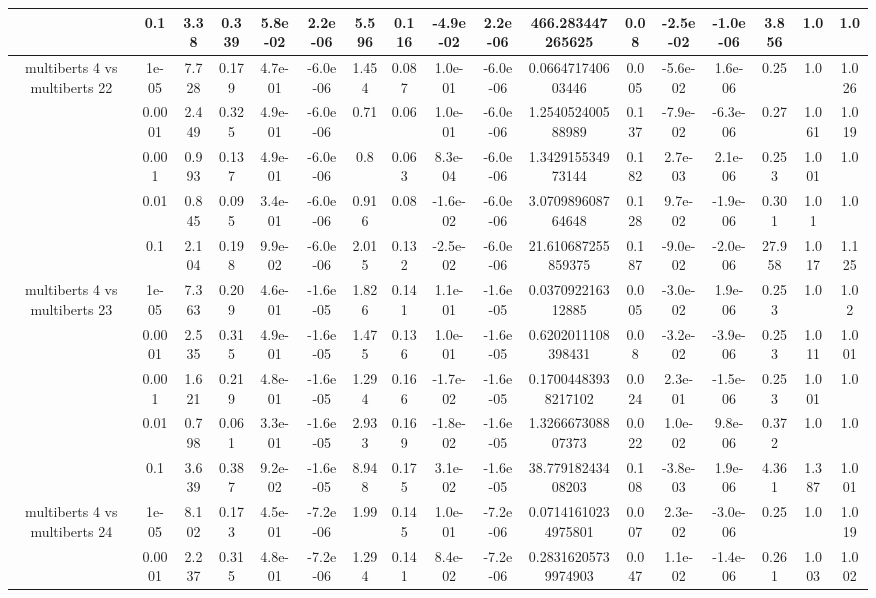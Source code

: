\begin{tabular}{|c|c|c|c|c|c|c|c|c|c|c|c|c|c|c|c|c|}
 & 0.1 & 3.38 & 0.339 & 5.8e-02 & 2.2e-06 & 5.596 & 0.116 & -4.9e-02 & 2.2e-06 & 466.283447265625 & 0.08 & -2.5e-02 & -1.0e-06 & 3.856 & 1.0 & 1.0 \\
\hline
\multirow{5}{*}{multiberts 4 vs multiberts 22} & 1e-05 & 7.728 & 0.179 & 4.7e-01 & -6.0e-06 & 1.454 & 0.087 & 1.0e-01 & -6.0e-06 & 0.066471740603446 & 0.005 & -5.6e-02 & 1.6e-06 & 0.25 & 1.0 & 1.026 \\
 & 0.0001 & 2.449 & 0.325 & 4.9e-01 & -6.0e-06 & 0.71 & 0.06 & 1.0e-01 & -6.0e-06 & 1.254052400588989 & 0.137 & -7.9e-02 & -6.3e-06 & 0.27 & 1.061 & 1.019 \\
 & 0.001 & 0.993 & 0.137 & 4.9e-01 & -6.0e-06 & 0.8 & 0.063 & 8.3e-04 & -6.0e-06 & 1.342915534973144 & 0.182 & 2.7e-03 & 2.1e-06 & 0.253 & 1.001 & 1.0 \\
 & 0.01 & 0.845 & 0.095 & 3.4e-01 & -6.0e-06 & 0.916 & 0.08 & -1.6e-02 & -6.0e-06 & 3.070989608764648 & 0.128 & 9.7e-02 & -1.9e-06 & 0.301 & 1.01 & 1.0 \\
 & 0.1 & 2.104 & 0.198 & 9.9e-02 & -6.0e-06 & 2.015 & 0.132 & -2.5e-02 & -6.0e-06 & 21.610687255859375 & 0.187 & -9.0e-02 & -2.0e-06 & 27.958 & 1.017 & 1.125 \\
\hline
\multirow{5}{*}{multiberts 4 vs multiberts 23} & 1e-05 & 7.363 & 0.209 & 4.6e-01 & -1.6e-05 & 1.826 & 0.141 & 1.1e-01 & -1.6e-05 & 0.037092216312885 & 0.005 & -3.0e-02 & 1.9e-06 & 0.253 & 1.0 & 1.02 \\
 & 0.0001 & 2.535 & 0.315 & 4.9e-01 & -1.6e-05 & 1.475 & 0.136 & 1.0e-01 & -1.6e-05 & 0.6202011108398431 & 0.08 & -3.2e-02 & -3.9e-06 & 0.253 & 1.011 & 1.001 \\
 & 0.001 & 1.621 & 0.219 & 4.8e-01 & -1.6e-05 & 1.294 & 0.166 & -1.7e-02 & -1.6e-05 & 0.17004483938217102 & 0.024 & 2.3e-01 & -1.5e-06 & 0.253 & 1.001 & 1.0 \\
 & 0.01 & 0.798 & 0.061 & 3.3e-01 & -1.6e-05 & 2.933 & 0.169 & -1.8e-02 & -1.6e-05 & 1.326667308807373 & 0.022 & 1.0e-02 & 9.8e-06 & 0.372 & 1.0 & 1.0 \\
 & 0.1 & 3.639 & 0.387 & 9.2e-02 & -1.6e-05 & 8.948 & 0.175 & 3.1e-02 & -1.6e-05 & 38.77918243408203 & 0.108 & -3.8e-03 & 1.9e-06 & 4.361 & 1.387 & 1.001 \\
\hline
\multirow{5}{*}{multiberts 4 vs multiberts 24} & 1e-05 & 8.102 & 0.173 & 4.5e-01 & -7.2e-06 & 1.99 & 0.145 & 1.0e-01 & -7.2e-06 & 0.07141610234975801 & 0.007 & 2.3e-02 & -3.0e-06 & 0.25 & 1.0 & 1.019 \\
 & 0.0001 & 2.237 & 0.315 & 4.8e-01 & -7.2e-06 & 1.294 & 0.141 & 8.4e-02 & -7.2e-06 & 0.28316205739974903 & 0.047 & 1.1e-02 & -1.4e-06 & 0.261 & 1.003 & 1.002 \\

\end{tabular}
